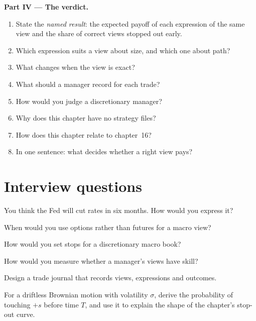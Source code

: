 \begin{problem}
\medskip\noindent\textbf{Part IV --- The verdict.}
\begin{enumerate}[resume]
\item State the \emph{named result}: the expected payoff of each expression of the same view and the share of correct views stopped out early.
\item Which expression suits a view about size, and which one about path?
\item What changes when the view is exact?
\item What should a manager record for each trade?
\item How would you judge a discretionary manager?
\item Why does this chapter have no strategy files?
\item How does this chapter relate to chapter~16?
\item In one sentence: what decides whether a right view pays?
\end{enumerate}
\end{problem}

\section{Interview questions}

\begin{interviewq}\label{iq:s2:discretionary-macro:1}
You think the Fed will cut rates in six months. How would you express it?
\end{interviewq}

\begin{interviewq}\label{iq:s2:discretionary-macro:2}
When would you use options rather than futures for a macro view?
\end{interviewq}

\begin{interviewq}\label{iq:s2:discretionary-macro:3}
How would you set stops for a discretionary macro book?
\end{interviewq}

\begin{interviewq}\label{iq:s2:discretionary-macro:4}
How would you measure whether a manager's views have skill?
\end{interviewq}

\begin{interviewq}\label{iq:s2:discretionary-macro:5}
Design a trade journal that records views, expressions and outcomes.
\end{interviewq}

\begin{interviewq}\label{iq:s2:discretionary-macro:6}
For a driftless Brownian motion with volatility $\sigma$, derive the probability of touching $+s$ before time $T$, and use it to explain the shape of
the chapter's stop-out curve.
\end{interviewq}
